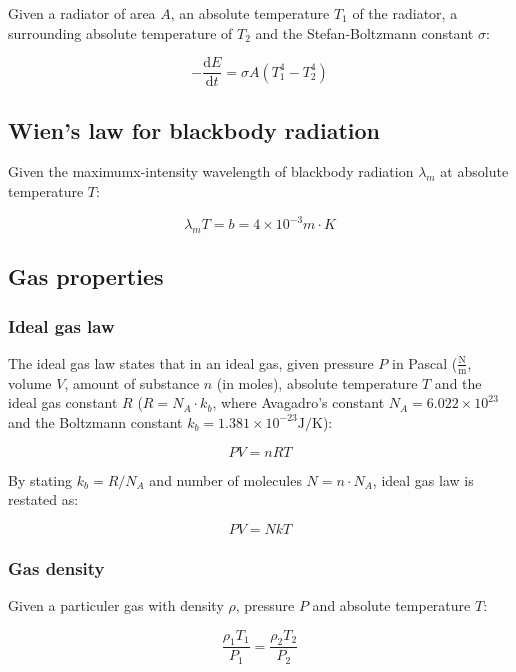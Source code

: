 \documentclass[12pt]{article}
\begin{document}
Given a radiator of area $A$, an absolute temperature $T_1$ of the radiator, a surrounding absolute temperature of $T_2$ and the Stefan-Boltzmann constant $\sigma$:

\[
\boxed{
- \frac{\mathrm{d}E}{\mathrm{d}t} = \sigma A \left(T_1^4 - T_2^4\right)
}
\]

\subsection{Wien's law for blackbody radiation}

Given the maximumx-intensity wavelength of blackbody radiation $\lambda_m$ at absolute temperature $T$:

\[
\boxed{
\lambda_m T = b = 4 \times 10^{-3} m\cdot K
}
\]


\newpage

\subsection{Gas properties}

\subsubsection{Ideal gas law}

The ideal gas law states that in an ideal gas, given pressure $P$ in Pascal ($\frac{\text{N}}{\text{m}}$, volume $V$, amount of substance $n$ (in moles), absolute temperature $T$ and the ideal gas constant $R$ ($R=N_A \cdot k_b$, where Avagadro's constant $N_A = 6.022 \times 10^{23}$ and the Boltzmann constant $k_b = 1.381 \times 10^{-23}\text{J/K}$):

\[
\boxed{
PV = nRT
}
\]

By stating $k_b = R/N_A$ and number of molecules $N = n\cdot N_A$, ideal gas law is restated as:

\[
\boxed{
PV = NkT
}
\]

\subsubsection{Gas density}

Given a particuler gas with density $\rho$, pressure $P$ and absolute temperature $T$:

\[
\boxed{
\frac{\rho_1 T_1}{P_1} = \frac{\rho_2 T_2}{P_2}
}
\]
\end{document}
